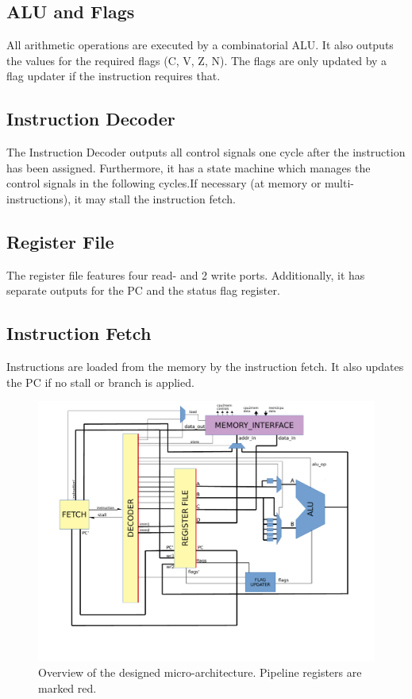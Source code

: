 \subsection{ALU and Flags}
All arithmetic operations are executed by a combinatorial ALU. It also outputs the values for the required flags (C, V, Z, N). The flags are only updated by a flag updater if the instruction requires that.

\subsection{Instruction Decoder}
The Instruction Decoder outputs all control signals one cycle after the instruction has been assigned. Furthermore, it has a state machine which manages the control signals in the following cycles.If necessary (at memory or multi-instructions), it may stall the instruction fetch. 

\subsection{Register File}
The register file features four read- and 2 write ports. Additionally, it has separate outputs for the PC and the status flag register.

\subsection{Instruction Fetch}
Instructions are loaded from the memory by the instruction fetch. It also updates the PC if no stall or branch is applied.


\begin{figure}
\includegraphics[scale=0.65]{images/processorOverview}
\caption{Overview of the designed micro-architecture. Pipeline registers are marked red.}
\label{fig:processorOverview}
\end{figure}

